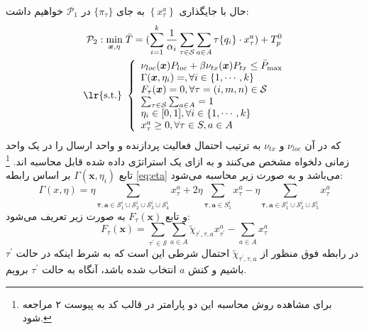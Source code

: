 حال با جایگذاری $\left\{x_{\tau}^{a}\right\}$ به جای $\{\pi_\tau\}$ در
$\mathcal{P}_{1}$
خواهیم داشت:
\begin{equation}
	\label{eq:p2}
	\begin{aligned}
		\mathcal{P}_{2}: \min _{\boldsymbol{x}, \eta}\; & \bar{T}=(\sum_{i=1}^{k} \frac{1}{\alpha_i} \sum_{\tau \in \mathcal{S}} \sum_{a \in A} \tau\{q_i\} \cdot x_{\tau}^{a})+ T_p^0 \\
		\text { \lr{s.t.} } &\left\{\begin{array}{l}
			\nu_{l o c}(\boldsymbol{x}) P_{l o c}+\beta \nu_{t x}(\boldsymbol{x}) P_{t x} \leq \bar{P}_{\max } \\
			\Gamma(\boldsymbol{x}, \eta_i)=, \forall i \in \{1, \cdots, k\}\\
			F_{\tau}(\boldsymbol{x})=0, \forall \tau=(i, m, n) \in \mathcal{S} \\
			\sum_{\tau \in \mathcal{S}} \sum_{a \in A}=1 \\
			\eta_i \in [0, 1], \forall i \in \{1, \cdots, k\} \\
			x_{\tau}^{a} \geq 0, \forall \tau \in S, a \in A
		\end{array}\right.
	\end{aligned}
\end{equation}
که در آن
$\nu_{l o c}$
و
$\nu_{t x}$
به ترتیب احتمال فعالیت پردازنده و واحد ارسال را در یک واحد زمانی دلخواه مشخص می‌کنند و به ازای یک استراتژی داده شده قابل محاسبه اند. \footnote{برای مشاهده روش محاسبه این دو پارامتر در قالب کد به پیوست ۲ مراجعه شود.} تابع
$\Gamma(\boldsymbol{x}, \eta_i)$
بر اساس رابطه \ref{eq:eta} می‌باشد و به صورت زیر محاسبه می‌شود:
\begin{equation}
	\Gamma(x, \eta) = \eta  \sum_{\boldsymbol{\tau, a} \in \mathcal{S}_{1}^i\cup\mathcal{S}_{2}^i\cup\mathcal{S}_{3}^i\cup\mathcal{S}_{4}^i} x_{\tau}^a + 2 \eta \sum_{\boldsymbol{\tau, a} \in S_5^i} x_{\tau}^a
	- \eta \sum_{\boldsymbol{\tau, a} \in \mathcal{S}_{1}^i\cup\mathcal{S}_{3}^i\cup\mathcal{S}_{5}^i} x_{\tau}^a
\end{equation}
و تابع 
$F_{\tau}(\boldsymbol{x})$
به صورت زیر تعریف می‌شود:
\begin{equation}
	F_{\tau}(\boldsymbol{x})=\sum_{\tau^{\prime} \in \mathcal{S}} \sum_{a \in A} \tilde{\chi}_{\tau^{\prime}, \tau, a} x_{\tau^{\prime}}^{a}-\sum_{a \in A} x_{\tau}^{a}
\end{equation}
در رابطه فوق منظور از
$ \tilde{\chi}_{\tau^{\prime}, \tau, a}$
احتمال شرطی این است که به شرط اینکه در حالت
$\tau^{\prime}$
باشیم و کنش
$a$
انتخاب شده باشد، آنگاه به حالت
$\tau^{\prime}$
برویم. \\

